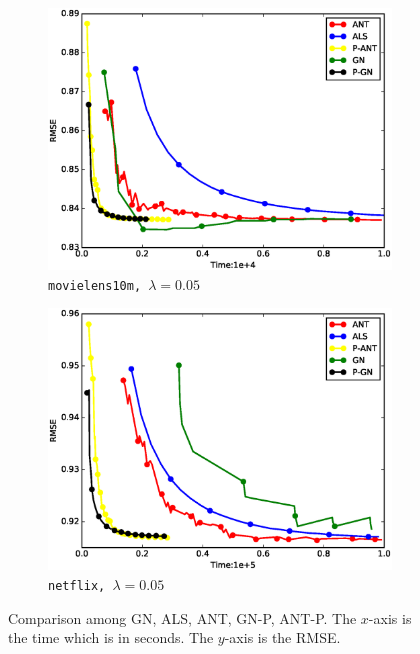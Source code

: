 \documentclass[11pt,twoside]{article}
\begin{document}
\begin{figure}
    \centering
    \begin{subfigure}[b]{0.32\textwidth}
        \centering
        \includegraphics[width=1.03\textwidth]{./figures/ml.rmse.eps}
        \caption{\tt movielens10m, $\lambda=0.05$}
    \end{subfigure}
    \begin{subfigure}[b]{0.32\textwidth}
        \centering
        \includegraphics[width=1.03\textwidth]{./figures/nf.rmse.eps}
        \caption{\tt netflix, $\lambda=0.05$}
    \end{subfigure}
        \caption{Comparison among GN, ALS, ANT, GN-P, ANT-P.
             The $x$-axis is the time which is in seconds.
             The $y$-axis is the RMSE.}
    \label{fig:freqrmsevstime}
\end{figure}
\fi
\end{document}
